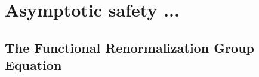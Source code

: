 \documentclass[11pt, a4paper]{article}
\begin{document}
\section{Asymptotic safety ...}

\subsection{The Functional Renormalization Group Equation}


\end{document}

